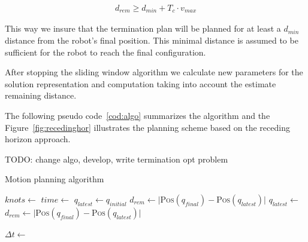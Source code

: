 \documentclass[eprint]{actapoly}
\begin{document}
\begin{align}
  d_{rem} \geq d_{min} + T_c \cdot v_{max}
\end{align}

This way we insure that the termination plan will be planned for at least a 
$d_{min}$ distance from the robot's final position.
This minimal distance is assumed to be sufficient for the robot to reach the 
final configuration.

After stopping the sliding window algorithm we calculate new parameters for the 
solution representation and computation taking into
account the estimate remaining distance.

The following pseudo code~\ref{cod:algo} summarizes the algorithm and the Figure~\ref{fig:recedinghor} illustrates
the planning scheme based on the receding horizon approach.

TODO: change algo, develop, write termination opt problem

\begin{algorithm}
    \caption{Motion planning algorithm\label{cod:algo}}
    \label{swpa}
    \begin{algorithmic}[1] %
	    \State $knots \gets $
	    \State $time \gets $
	    \State $q_{latest} \gets q_{initial}$
	    \State $d_{rem} \gets |${\scshape Pos}$(q_{final}) - ${\scshape Pos}$(q_{latest})|$
		\State $q_{latest} \gets $
		\State $d_{rem} \gets |${\scshape Pos}$(q_{final}) - ${\scshape Pos}$(q_{latest})|$
		
	    \EndWhile\label{planningwhile}
	    \State $\Delta t \gets $
	    
        \EndProcedure
    \end{algorithmic}
\end{algorithm}
\end{document}
